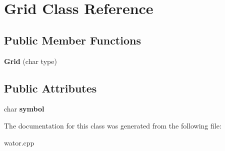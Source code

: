 \hypertarget{class_grid}{}\section{Grid Class Reference}
\label{class_grid}
\subsection*{Public Member Functions}
\begin{DoxyCompactItemize}
\item 
{\bfseries Grid} (char type)\hypertarget{class_grid_ad120494793e68833c30d453e0bd852f1}{}\label{class_grid_ad120494793e68833c30d453e0bd852f1}

\end{DoxyCompactItemize}
\subsection*{Public Attributes}
\begin{DoxyCompactItemize}
\item 
char {\bfseries symbol}\hypertarget{class_grid_ad8d90f4da2cebfeeda274cccb2d6d378}{}\label{class_grid_ad8d90f4da2cebfeeda274cccb2d6d378}

\end{DoxyCompactItemize}


The documentation for this class was generated from the following file\+:\begin{DoxyCompactItemize}
\item 
wator.\+cpp\end{DoxyCompactItemize}
